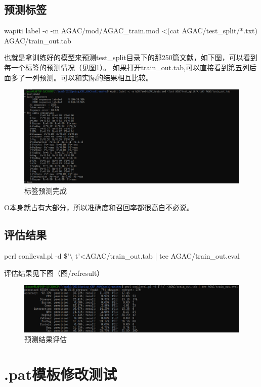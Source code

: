 \documentclass[12pt]{article}
\begin{document}
\subsection{预测标签}
wapiti label -c -m AGAC/mod/AGAC\_train.mod <(cat AGAC/test\_split/*.txt) AGAC/train\_out.tab\par
也就是拿训练好的模型来预测test\_split目录下的那250篇文献，如下图，可以看到每一个标签的预测情况（见图\ref{sad}）。
如果打开train\_out.tab,可以直接看到第五列后面多了一列预测。可以和实际的结果相互比较。
\begin{figure}[H]
  \centering
  \includegraphics[scale=0.4]{./picture/predict.png} %
  \caption{标签预测完成} %
  \label{sad} %
\end{figure}
O本身就占有大部分，所以准确度和召回率都很高自不必说。
\subsection{评估结果}
perl conlleval.pl -d \$'$\setminus$ t'<AGAC/train\_out.tab | tee AGAC/train\_out.eval \par
评估结果见下图（图/ref{result}）
\begin{figure}[H]
  \centering
  \includegraphics[scale=0.4]{./picture/result.png} %
  \caption{预测结果评估} %
  \label{result} %
\end{figure}



\section{.pat模板修改测试}
\end{document}
